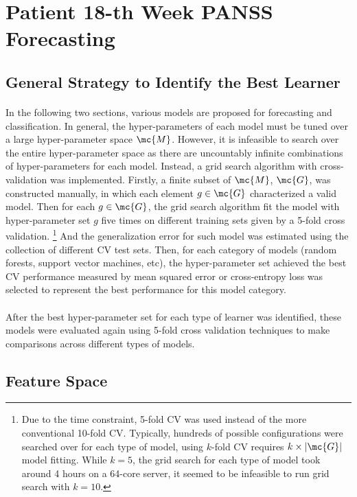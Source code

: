 \documentclass[11pt]{article}
\begin{document}
	\section{Patient 18-th Week PANSS Forecasting}
	\subsection{General Strategy to Identify the Best Learner} 
	\paragraph{} In the following two sections, various models are proposed for forecasting and classification. In general, the hyper-parameters of each model must be tuned over a large hyper-parameter space $\mc{M}$. However, it is infeasible to search over the entire hyper-parameter space as there are uncountably infinite combinations of hyper-parameters for each model. Instead, a grid search algorithm with cross-validation was implemented. Firstly, a finite subset of $\mc{M}$, $\mc{G}$, was constructed manually, in which each element $g \in \mc{G}$ characterized a valid model. Then for each $g \in \mc{G}$, the grid search algorithm fit the model with hyper-parameter set $g$ five times on different training sets given by a 5-fold cross validation.
	\footnote{Due to the time constraint, 5-fold CV was used instead of the more conventional 10-fold CV. Typically, hundreds of possible configurations were searched over for each type of model, using $k$-fold CV requires $k \times |\mc{G}|$ model fitting. While $k=5$, the grid search for each type of model took around 4 hours on a 64-core server, it seemed to be infeasible to run grid search with $k=10$.}
	And the generalization error for such model was estimated using the collection of different CV test sets. Then, for each category of models (random forests, support vector machines, etc), the hyper-parameter set  achieved the best CV performance measured by mean squared error or cross-entropy loss was selected to represent the best performance for this model category.
	
	 \paragraph{} After the best hyper-parameter set for each type of learner was identified, these models were evaluated again using 5-fold cross validation techniques to make comparisons across different types of models.

	\subsection{Feature Space}
\end{document}
